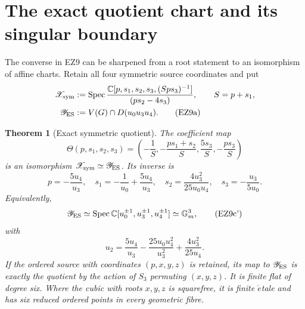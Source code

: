\documentclass[11pt]{article}
\newtheorem{theorem}{Theorem}[section]
\theoremstyle{definition}\newtheorem{definition}[theorem]{Definition}
\theoremstyle{remark}\newtheorem{remark}[theorem]{Remark}
\DeclareMathOperator{\Spec}{Spec}
\begin{document}
\section{The exact quotient chart and its singular boundary}

The converse in EZ9 can be sharpened from a root statement to an isomorphism
of affine charts.  Retain all four symmetric source coordinates and put
\begin{align}
 \mathscr X_{\rm sym}
  &:=\Spec\frac{\mathbb C[p,s_1,s_2,s_3,(Sps_3)^{-1}]}
                    {(ps_2-4s_3)},\qquad S=p+s_1,\nonumber\\
 \mathscr Y_{\rm ES}
  &:=V(G)\cap D(u_0u_3u_4).                            \tag{EZ9a}
\end{align}

\begin{theorem}[Exact symmetric quotient]
The coefficient map
\begin{equation}
 \Theta(p,s_1,s_2,s_3)=
 \left(-\frac1S,-\frac{ps_1+s_2}{S},
       \frac{5s_3}{S},-\frac{ps_3}{S}\right)          \tag{EZ9b}
\end{equation}
is an isomorphism \(\mathscr X_{\rm sym}\simeq\mathscr Y_{\rm ES}\).
Its inverse is
\begin{equation}
 \boxed{
 p=-\frac{5u_4}{u_3},\quad
 s_1=-\frac1{u_0}+\frac{5u_4}{u_3},\quad
 s_2=\frac{4u_3^2}{25u_0u_4},\quad
 s_3=-\frac{u_3}{5u_0}.}                              \tag{EZ9c}
\end{equation}
Equivalently,
\begin{equation}
 \mathscr Y_{\rm ES}\simeq
 \Spec\mathbb C[u_0^{\pm1},u_3^{\pm1},u_4^{\pm1}]
 \simeq\mathbb G_m^3,                                 \tag{EZ9c'}
\end{equation}
with
\[
 u_2=\frac{5u_4}{u_3}-\frac{25u_0u_4^2}{u_3^2}
                    +\frac{4u_3^2}{25u_4}.
\]
If the ordered source with coordinates \((p,x,y,z)\) is retained, its map
to \(\mathscr Y_{\rm ES}\) is exactly the quotient by the action of
\(S_3\) permuting \((x,y,z)\).  It is finite flat of degree six.  Where
the cubic with roots \(x,y,z\) is squarefree, it is finite
\(\acute{e}\)tale and has six reduced ordered points in every geometric
fibre.
\end{theorem}
\end{document}
